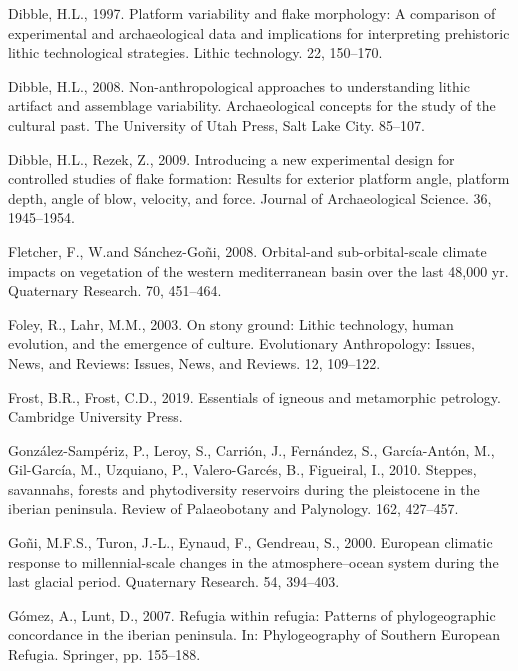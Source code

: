 \documentclass[12pt,twoside]{reedthesis}
\begin{document}
\leavevmode\hypertarget{ref-dibble1997}{}%
Dibble, H.L., 1997. Platform variability and flake morphology: A comparison of experimental and archaeological data and implications for interpreting prehistoric lithic technological strategies. Lithic technology. 22, 150--170.

\leavevmode\hypertarget{ref-dibble2008}{}%
Dibble, H.L., 2008. Non-anthropological approaches to understanding lithic artifact and assemblage variability. Archaeological concepts for the study of the cultural past. The University of Utah Press, Salt Lake City. 85--107.

\leavevmode\hypertarget{ref-dibble2009}{}%
Dibble, H.L., Rezek, Z., 2009. Introducing a new experimental design for controlled studies of flake formation: Results for exterior platform angle, platform depth, angle of blow, velocity, and force. Journal of Archaeological Science. 36, 1945--1954.

\leavevmode\hypertarget{ref-fletcher2008}{}%
Fletcher, F., W.and Sánchez-Goñi, 2008. Orbital-and sub-orbital-scale climate impacts on vegetation of the western mediterranean basin over the last 48,000 yr. Quaternary Research. 70, 451--464.

\leavevmode\hypertarget{ref-foley2003}{}%
Foley, R., Lahr, M.M., 2003. On stony ground: Lithic technology, human evolution, and the emergence of culture. Evolutionary Anthropology: Issues, News, and Reviews: Issues, News, and Reviews. 12, 109--122.

\leavevmode\hypertarget{ref-frost2019}{}%
Frost, B.R., Frost, C.D., 2019. Essentials of igneous and metamorphic petrology. Cambridge University Press.

\leavevmode\hypertarget{ref-gonzalez-samperiz2010}{}%
González-Sampériz, P., Leroy, S., Carrión, J., Fernández, S., García-Antón, M., Gil-García, M., Uzquiano, P., Valero-Garcés, B., Figueiral, I., 2010. Steppes, savannahs, forests and phytodiversity reservoirs during the pleistocene in the iberian peninsula. Review of Palaeobotany and Palynology. 162, 427--457.

\leavevmode\hypertarget{ref-goni2000}{}%
Goñi, M.F.S., Turon, J.-L., Eynaud, F., Gendreau, S., 2000. European climatic response to millennial-scale changes in the atmosphere--ocean system during the last glacial period. Quaternary Research. 54, 394--403.

\leavevmode\hypertarget{ref-gomez2007}{}%
Gómez, A., Lunt, D., 2007. Refugia within refugia: Patterns of phylogeographic concordance in the iberian peninsula. In: Phylogeography of Southern European Refugia. Springer, pp. 155--188.
\end{document}
